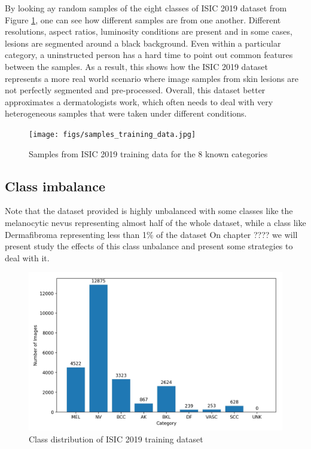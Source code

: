     By looking ay random samples of the eight classes of ISIC 2019 dataset from Figure \ref{fig:samples}, one can see how different samples are from one another. Different resolutions, aspect ratios, luminosity conditions are present and in some cases, lesions are segmented around a black background. Even within a particular category, a uninstructed person has a hard time to point out common features between the samples. As a result, this shows how the ISIC 2019 dataset represents a more real world scenario where image samples from skin lesions are not perfectly segmented and pre-processed. Overall, this dataset better approximates a dermatologists work, which often needs to deal with very heterogeneous samples that were taken under different conditions.  \par
    
    \begin{figure}
      \texttt{[image: figs/samples\_training\_data.jpg]}
      \caption{Samples from ISIC 2019 training data for the 8 known categories}
      \label{fig:samples}
    \end{figure}
    
\subsection{Class imbalance}
\label{subsection:imbalance}

    Note that the dataset provided is highly unbalanced with some classes like the melanocytic nevus representing almost half of the whole dataset, while a class like Dermafibroma representing less than 1\% of the dataset On chapter ???? we will present study the effects of this class unbalance and present some strategies to deal with it. \par
    
    \begin{figure}[h!]
      \includegraphics[width=\textwidth,keepaspectratio]{figs/training_data_distribution.jpg}
      \caption{Class distribution of ISIC 2019 training dataset}
      \label{fig:distribution}
    \end{figure}

